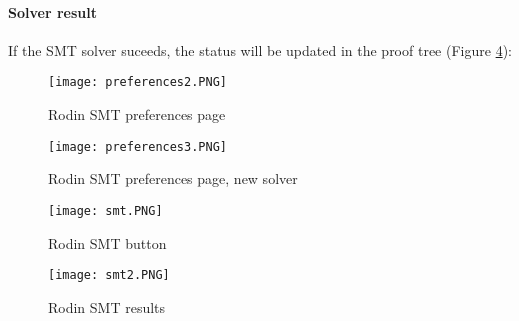 \paragraph{Solver result}
If the SMT solver suceeds, the status will be updated in the proof tree (Figure \ref{SMTResults}):

\begin{figure}[!p]
\centering
\texttt{[image: preferences2.PNG]}
\caption{Rodin SMT preferences page} 
\label{RodinSMTPreferences}
\end{figure}

\begin{figure}[!p]
\centering
\texttt{[image: preferences3.PNG]}
\caption{Rodin SMT preferences page, new solver} 
\label{NewSolverSMTPreferences}
\end{figure}

\begin{figure}[!p]
\centering
\texttt{[image: smt.PNG]}
\caption{Rodin SMT button} 
\label{LaunchSMT}
\end{figure}

\begin{figure}[!p]
\centering
\texttt{[image: smt2.PNG]}
\caption{Rodin SMT results} 
\label{SMTResults}
\end{figure}


